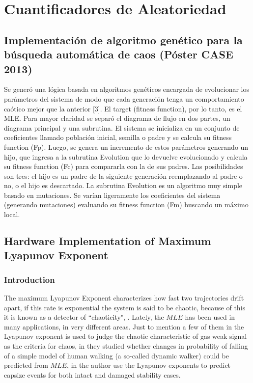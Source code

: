 \chapter{Cuantificadores de Aleatoriedad}

\section{Implementación de algoritmo genético para la búsqueda automática de caos (Póster CASE 2013)}

Se generó una lógica basada en algoritmos genéticos encargada de evolucionar los
parámetros del sistema de modo que cada generación tenga un comportamiento
caótico mejor que la anterior [3]. El target (fitness function), por lo tanto, es el MLE.
Para mayor claridad se separó el diagrama de flujo en dos partes, un diagrama principal
y una subrutina.
El sistema se inicializa en un conjunto de coeficientes llamado población inicial,
semilla o padre y se calcula su fitness function (Fp). Luego, se genera un incremento de
estos parámetros generando un hijo, que ingresa a la subrutina Evolution que lo
devuelve evolucionado y calcula su fitness function (Fc) para compararla con la de sus
padres. Las posibilidades son tres: el hijo es un padre de la siguiente generación
reemplazando al padre o no, o el hijo es descartado.
La subrutina Evolution es un algoritmo muy simple basado en mutaciones. Se
varían ligeramente los coeficientes del sistema (generando mutaciones) evaluando su
fitness function (Fm) buscando un máximo local.



\section{Hardware Implementation of Maximum Lyapunov Exponent}


\subsection{Introduction}

The maximum Lyapunov Exponent characterizes how fast two
trajectories drift apart, if this rate is exponential the system
is said to be chaotic, because of this it is known as a detector
of ``chaoticity", \cite{strotgartz1994,Kantz1994,Sprott2003}.
Lately, the $MLE$ has been used in many applications, in very
different areas. Just to mention a few of them in \cite{Ma2013}
the Lyapunov exponent is used to judge the chaotic characteristic
of gas weak signal as the criteria for chaos, in
\cite{Bruijna2011} they studied  whether changes  in probability
of  falling  of  a simple  model  of human  walking (a so-called
dynamic  walker) could  be  predicted from $MLE$, in
\cite{Story2009} the author use  the Lyapunov exponents to predict
capsize events for both intact and damaged stability cases.

